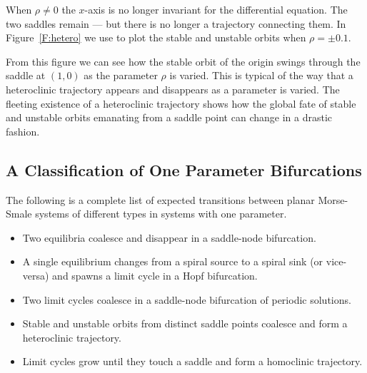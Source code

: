 \documentclass{ximera}
\begin{document}
When $\rho\neq 0$ the $x$-axis is no longer invariant for the differential 
equation.  The two saddles remain --- but there is no longer a 
trajectory connecting them.  In Figure~\ref{F:hetero} we use 
{\pplane} 
to plot the stable and unstable orbits when $\rho=\pm 0.1$.

From this figure we can see how the stable orbit of the origin swings 
through the saddle at $(1,0)$ as the parameter $\rho$ is varied.  This
is typical of the way that a heteroclinic trajectory appears and disappears 
as a parameter is varied.  The fleeting existence of a heteroclinic trajectory
shows how the global fate of stable and unstable orbits emanating from a 
saddle point can change in a drastic fashion. 


\subsection*{A Classification of One Parameter Bifurcations}

The following is a complete list of expected transitions between planar 
Morse-Smale systems of different types in systems with one parameter.
\begin{itemize}
\item	Two equilibria coalesce and disappear in a saddle-node bifurcation.
\item	A single equilibrium changes from a spiral source to a spiral sink (or 
vice-versa) and spawns a limit cycle in a Hopf bifurcation.
\item	Two limit cycles coalesce in a saddle-node bifurcation of 
periodic solutions.
\item	Stable and unstable orbits from distinct saddle points
coalesce and form a heteroclinic trajectory.
\item	Limit cycles grow until they touch a saddle and form a homoclinic 
trajectory.
\end{itemize}




\end{document}
